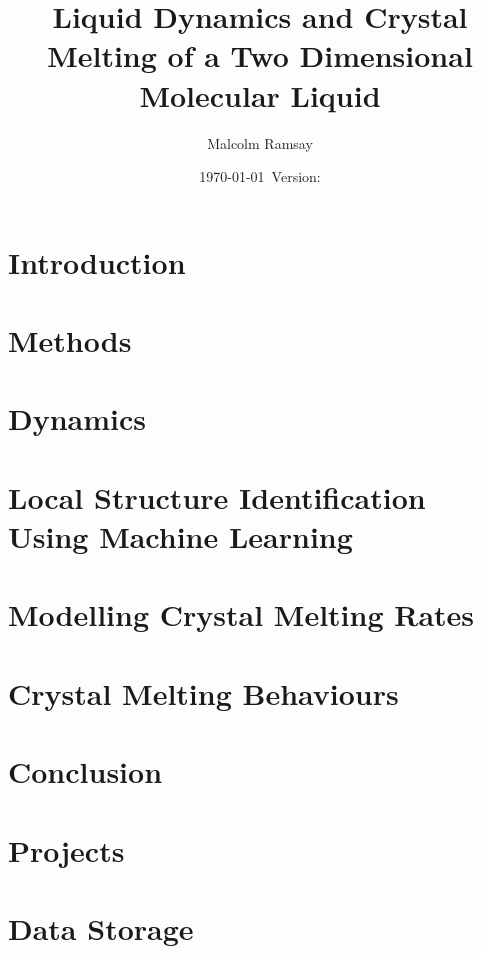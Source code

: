 \documentclass[12pt, a4paper]{report}
\title{Liquid Dynamics and Crystal Melting of a Two Dimensional Molecular Liquid}
\author{Malcolm Ramsay}
\date{\today{}~Version: \version}
\begin{document}
\beforepreface{}
\afterpreface{}

\chapter{Introduction} \label{sec:Introduction}






\chapter{Methods} \label{sec:Methods}







\chapter{Dynamics} \label{sec:Dynamics}




\chapter{Local Structure Identification Using Machine Learning} \label{sec:Machine_Learning}





\chapter{Modelling Crystal Melting Rates} \label{sec:Crystal_Melting}





\chapter{Crystal Melting Behaviours} \label{sec:Melting_Behaviour}





\chapter{Conclusion}

\printbibliography{}

\begin{appendices}
  \chapter{Projects}
  

  \chapter{Data Storage}
  

\end{appendices}
\end{document}
